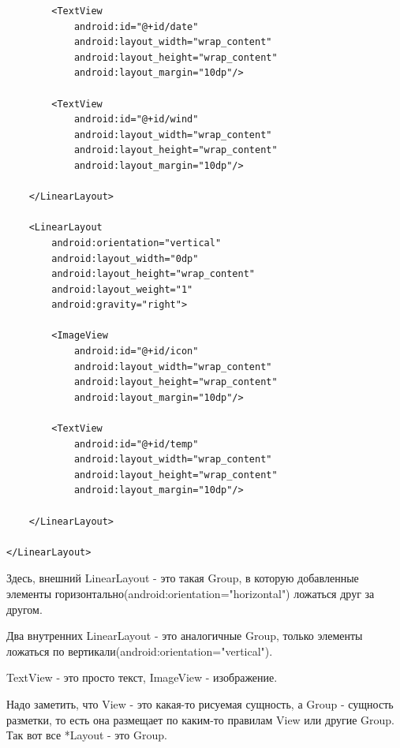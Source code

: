 \documentclass[12 pt]{article}
\begin{document}
\begin{itemize}
\begin{lstlisting}
        <TextView
            android:id="@+id/date"
            android:layout_width="wrap_content"
            android:layout_height="wrap_content"
            android:layout_margin="10dp"/>

        <TextView
            android:id="@+id/wind"
            android:layout_width="wrap_content"
            android:layout_height="wrap_content"
            android:layout_margin="10dp"/>

    </LinearLayout>

    <LinearLayout
        android:orientation="vertical"
        android:layout_width="0dp"
        android:layout_height="wrap_content"
        android:layout_weight="1"
        android:gravity="right">
        
        <ImageView
            android:id="@+id/icon"
            android:layout_width="wrap_content"
            android:layout_height="wrap_content"
            android:layout_margin="10dp"/>

        <TextView
            android:id="@+id/temp"
            android:layout_width="wrap_content"
            android:layout_height="wrap_content"
            android:layout_margin="10dp"/>

    </LinearLayout>

</LinearLayout>    
        \end{lstlisting} 
        
        Здесь, внешний LinearLayout - это такая Group, в которую добавленные элементы горизонтально(android:orientation="horizontal") ложаться друг за другом.
        
        Два внутренних LinearLayout - это аналогичные Group, только элементы ложаться по вертикали(android:orientation="vertical").
        
        TextView - это просто текст, ImageView - изображение.
        
        Надо заметить, что View - это какая-то рисуемая сущность, а Group - сущность разметки, то есть она размещает по каким-то правилам View или другие Group. Так вот все *Layout - это Group.
        

\end{itemize}
\end{document}
